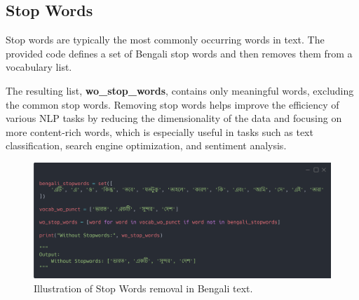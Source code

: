 \subsection{Stop Words}

Stop words are typically the most commonly occurring words in text. The provided code defines a set of Bengali stop words and then removes them from a vocabulary list.

The resulting list, \textbf{wo\_stop\_words}, contains only meaningful words, excluding the common stop words. Removing stop words helps improve the efficiency of various NLP tasks by reducing the dimensionality of the data and focusing on more content-rich words, which is especially useful in tasks such as text classification, search engine optimization, and sentiment analysis.

\begin{figure}[H]
    \centering
    \includegraphics[width=0.8\linewidth]{Attachments/Figures/stop-words_figure1.png}
    \caption{Illustration of Stop Words removal in Bengali text.}
\end{figure}